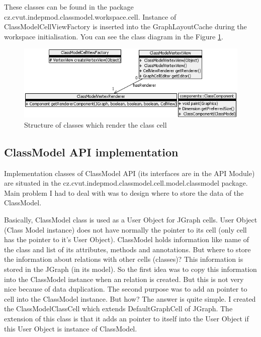 These classes can be found in the package cz.cvut.indepmod.classmodel.workspace.cell. Instance of ClassModelCellViewFactory is inserted into the GraphLayoutCache during the workspace initialisation. You can see the class diagram in the Figure \ref{f-ClassModelVertexStructure}.

\begin{figure}[!ht]
\begin{center}
\includegraphics[width=\textwidth]{img/ClassModelVertexStructure.png}
\caption{Structure of classes which render the class cell}
\label{f-ClassModelVertexStructure}
\end{center}
\end{figure}

\subsection{ClassModel API implementation}
\label{subsection:apiImplementation}

Implementation classes of ClassModel API (its interfaces are in the API Module) are situated in the cz.cvut.indepmod.classmodel.cell.model.classmodel package. Main problem I had to deal with was to design where to store the data of the ClassModel.

Basically, ClassModel class is used as a User Object for JGraph cells. User Object (Class Model instance) does not have normally the pointer to its cell (only cell has the pointer to it's User Object). ClassModel holds information like name of the class and list of its attributes, methods and annotations. But where to store the information about relations with other cells (classes)? This information is stored in the JGraph (in its model). So the first idea was to copy this information into the ClassModel instance when an relation is created. But this is not very nice because of data duplication. The second purpose was to add an pointer to cell into the ClassModel instance. But how? The answer is quite simple. I created the ClassModelClassCell which extends DefaultGraphCell of JGraph. The extension of this class is that it adds an pointer to itself into the User Object if this User Object is instance of ClassModel.

